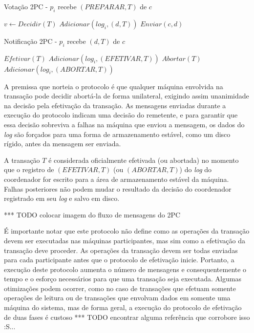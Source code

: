 \documentclass[11pt,twoside,a4paper]{book}
\begin{document}
\begin{algorithm}
\caption{Votação 2PC - $p_i$ recebe $(PREPARAR, T)$ de $c$}
\label{alg:2pc_participante1}
\begin{algorithmic}[1]
\State $v \gets Decidir(T)$
\State $Adicionar(log_i, (d, T))$
\State $Enviar(c, d)$
\end{algorithmic}
\end{algorithm}

\begin{algorithm}
\caption{Notificação 2PC - $p_i$ recebe $(d, T)$ de $c$}
\label{alg:2pc_participante2}
\begin{algorithmic}[1]
	\State $Efetivar(T)$
	\State $Adicionar(log_i, (EFETIVAR, T))$
\Else
	\State $Abortar(T)$
	\State $Adicionar(log_i, (ABORTAR, T))$
\EndIf
\end{algorithmic}
\end{algorithm}

A premissa que norteia o protocolo é que qualquer máquina envolvida na transação pode decidir abortá-la de forma unilateral, exigindo assim unanimidade na decisão pela efetivação da transação. As mensagens enviadas durante a execução do protocolo indicam uma decisão do remetente, e para garantir que essa decisão sobreviva a falhas na máquina que enviou a mensagem, os dados do \emph{log} são forçados para uma forma de armazenamento estável, como um disco rígido, antes da mensagem ser enviada.

A transação $T$ é considerada oficialmente efetivada (ou abortada) no momento que o registro de $(EFETIVAR, T)$ (ou $(ABORTAR, T)$) do \emph{log} do coordenador for escrito para a área de armazenamento estável da máquina. Falhas posteriores não podem mudar o resultado da decisão do coordenador registrado em seu \emph{log} e salvo em disco.

*** TODO colocar imagem do fluxo de mensagens do 2PC

É importante notar que este protocolo não define como as operações da transação devem ser executadas nas máquinas participantes, mas sim como a efetivação da transação deve proceder. As operações da transação devem ser todas enviadas para cada participante antes que o protocolo de efetivação inicie. Portanto, a execução deste protocolo aumenta o número de mensagens e consequentemente o tempo e o esforço necessários para que uma transação seja executada. Algumas otimizações podem ocorrer, como no caso de transações que efetuam somente operações de leitura ou de transações que envolvam dados em somente uma máquina do sistema, mas de forma geral, a execução do protocolo de efetivação de duas fases é custoso *** TODO encontrar alguma referência que corrobore isso :S...
\end{document}
